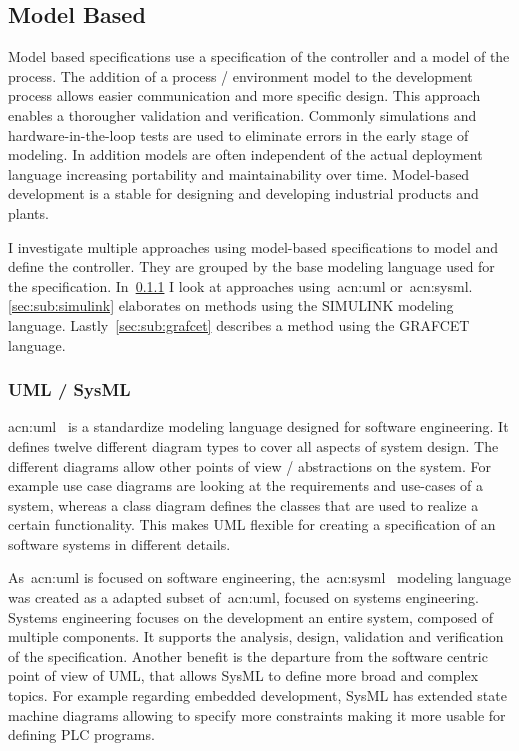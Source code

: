 \subsection{Model Based}
\label{sec:sub:mb}

Model based specifications use a specification of the controller and a model of the process.
The addition of a process / environment model to the development process allows easier communication and more specific design.
This approach enables a thorougher validation and verification.
Commonly simulations and hardware-in-the-loop tests are used to eliminate errors in the early stage of modeling.
In addition models are often independent of the actual deployment language increasing portability and maintainability over time.
Model-based development is a stable for designing and developing industrial products and plants.

I investigate multiple approaches using model-based specifications to model and define the controller.
They are grouped by the base modeling language used for the specification.
In~\ref{sec:sub:uml} I look at approaches using~\acrshort{acn:uml} or~\acrlong{acn:sysml}.
\ref{sec:sub:simulink} elaborates on methods using the SIMULINK modeling language.
Lastly~\ref{sec:sub:grafcet} describes a method using the GRAFCET language.

\subsubsection{UML / SysML}
\label{sec:sub:uml}

\acrfull{acn:uml}~\cite{UML:2-5-1} is a standardize modeling language designed for software engineering.
It defines twelve different diagram types to cover all aspects of system design.
The different diagrams allow other points of view / abstractions on the system.
For example use case diagrams are looking at the requirements and use-cases of a system, whereas a class diagram defines the classes that are used to realize a certain functionality.
This makes UML flexible for creating a specification of an software systems in different details.

As~\acrshort{acn:uml} is focused on software engineering, the~\acrfull{acn:sysml}~\cite{SysML:1-6} modeling language was created as a adapted subset of~\acrshort{acn:uml}, focused on systems engineering.
Systems engineering focuses on the development an entire system, composed of multiple components.
It supports the analysis, design, validation and verification of the specification.
Another benefit is the departure from the software centric point of view of UML, that allows SysML to define more broad and complex topics.
For example regarding embedded development, SysML has extended state machine diagrams allowing to specify more constraints making it more usable for defining PLC programs.

